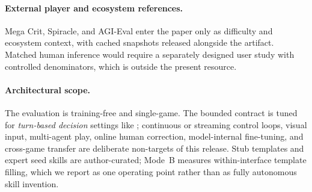 \paragraph{External player and ecosystem references.}
Mega Crit, Spiracle, and AGI-Eval enter the paper only as
difficulty and ecosystem context, with cached snapshots released
alongside the artifact. Matched human inference would require a
separately designed user study with controlled denominators, which
is outside the present resource.

\paragraph{Architectural scope.}
The evaluation is training-free and single-game. The bounded
contract is tuned for \emph{turn-based decision} settings like
\stspad{}; continuous or streaming control loops, visual input,
multi-agent play, online human correction, model-internal
fine-tuning, and cross-game transfer are deliberate non-targets of
this release. Stub templates and expert seed skills are
author-curated; Mode~B measures within-interface template filling,
which we report as one operating point rather than as fully
autonomous skill invention.
